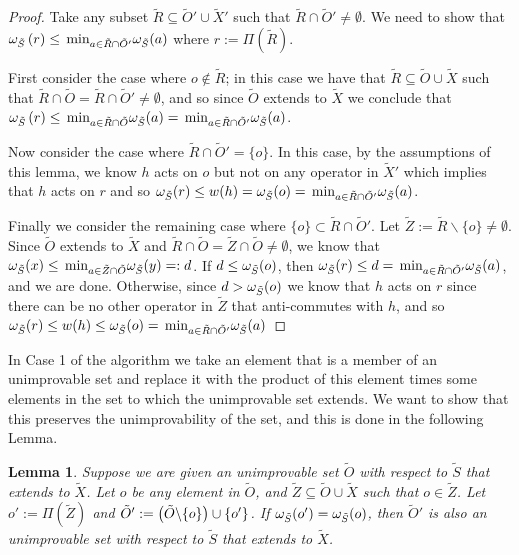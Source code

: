 \documentclass[twocolumn,showpacs,preprintnumbers,amsmath,amssymb,nofootinbib,pra,floatfix]{revtex4-1}
\newtheorem{lemma}{Lemma}
\newenvironment{remark}[1][Remark]{\begin{trivlist}
\item[\hskip \labelsep {\bfseries #1}]}{\end{trivlist}}
\newcommand{\set}{\tilde}
\begin{document}
\begin{proof}
Take any subset $\set R\subseteq \set O'\cup\set X'$ such that $\set R\cap\set O'\ne\emptyset$.  We need to show that $\om_{\set S}\paren{r} \le \min_{a\in\set R\cap\set O'}\om_{\set S}(a)$ where $r:=\Pi(\set R)$.

First consider the case where $o\notin \set R$;  in this case we have that $\set R\subseteq \set O\cup\set X$ such that $\set R\cap\set O=\set R\cap\set O'\ne\emptyset$, and so since $\set O$ extends to $\set X$ we conclude that $\om_{\set S}\paren{r} \le \min_{a\in\set R\cap\set O}\om_{\set S}(a)= \min_{a\in\set R\cap\set O'}\om_{\set S}(a)$.

Now consider the case where $\set R\cap\set O'=\{o\}$.  In this case, by the assumptions of this lemma, we know $h$ acts on $o$ but not on any operator in $\set X'$ which implies that $h$ acts on $r$ and so $\om_{\set S}(r) \le w(h)=\om_{\set S}(o)=\min_{a\in\set R\cap\set O'}\om_{\set S}(a)$.

Finally we consider the remaining case where $\{o\}\subset\set R\cap\set O'$. Let $\set Z := \set R\backslash\{o\}\ne\emptyset$.  Since $\set O$ extends to $\set X$ and $\set R\cap\set O=\set Z\cap\set O\ne\emptyset$, we know that $\om_{\set S}(x)\le \min_{a\in\set Z\cap\set O}\om_{\set S}(y)=:d$.  If $d \le \om_{\set S}(o)$, then $\om_{\set S}(r)\le d = \min_{a\in\set R\cap\set O'}\om_{\set S}(a)$, and we are done.  Otherwise, since $d> \om_{\set S}(o)$ we know that $h$ acts on $r$ since there can be no other operator in $\set Z$ that anti-commutes with $h$, and so $\om_{\set S}(r) \le w(h)\le\om_{\set S}(o)=\min_{a\in\set R\cap\set O'}\om_{\set S}(a)$
\end{proof}
\begin{remark}
In Case 1 of the algorithm we take an element that is a member of an unimprovable set and replace it with the product of this element times some elements in the set to which the unimprovable set extends.  We want to show that this preserves the unimprovability of the set, and this is done in the following Lemma.
\end{remark}

\begin{lemma}
\label{lemma:replacing element with product preserves unimprovability}
Suppose we are given an unimprovable set $\set O$ with respect to $\set S$ that extends to $\set X$.  Let $o$ be any element in $\set O$, and $\set Z\subseteq \set O\cup\set X$ such that $o\in \set Z$.  Let $o':=\Pi(\set Z)$ and $\set O' := \paren{\set O\backslash\{o\}}\cup\{o'\}$.  If $\om_{\set S}(o')=\om_{\set S}(o)$, then $\set O'$ is also an unimprovable set with respect to $\set S$ that extends to $\set X$.
\end{lemma}
\end{document}
